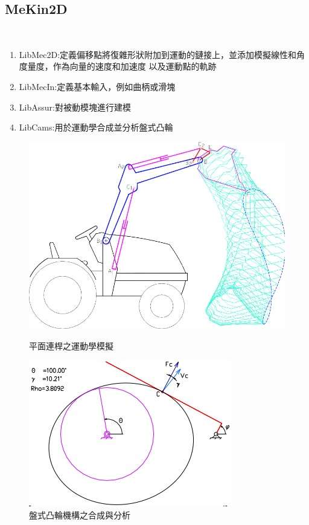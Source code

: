 \documentclass[14pt,a4paper]{report}  %
\newcommand{\fourteen}{\fontsize{14pt}{\baselineskip}\selectfont}%
\begin{document}
      \subsection{MeKin2D}
       \hspace*{\fill} \\
       \fourteen {MeKin2D為一種用Free Pascal編寫的子程序包。主要功能使用模組化設計對平面連桿進行運動學模擬、盤式凸輪機構的合成與分析，如圖2.1、圖2.2。其中，MeKin2D的套件包含4個子程式。 分別有:}
       \begin{enumerate} 
       \item LibMec2D:定義偏移點將復雜形狀附加到運動的鏈接上，並添加模擬線性和角度量度，作為向量的速度和加速度			以及運動點的軌跡
       \item LibMecIn:定義基本輸入，例如曲柄或滑塊
       \item LibAssur:對被動模塊進行建模
       \item LibCams:用於運動學合成並分析盤式凸輪
       \end{enumerate}
       	\begin{figure}[H]
        	\centering
        	\includegraphics[scale=0.4]{平面連桿之運動學模擬.png} 
        	\caption{平面連桿之運動學模擬} 
        	\label{fig:scale}
        	\includegraphics[scale=0.8]{盤式凸輪機構之合成與分析.png} 
        	\caption{盤式凸輪機構之合成與分析} 
        	\label{fig:scale}   
    	\end{figure}
    	 \hspace*{\fill} \\
\end{document}
